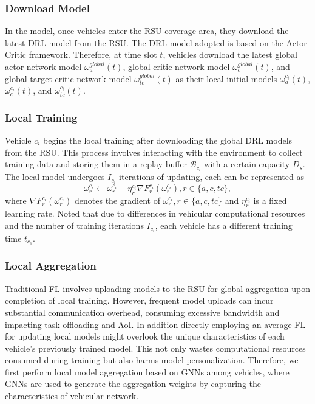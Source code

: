 \documentclass[lettersize,journal,onecolumn]{IEEEtran}
\begin{document}
\subsubsection {Download Model} In the model, once vehicles enter the RSU coverage area, they download the latest DRL model from the RSU. The DRL model adopted  is based on the Actor-Critic framework. Therefore, at time slot $t$, vehicles download the latest global actor network model $\omega _{a}^{global}(t)$, global critic network model $\omega _{c}^{global}(t)$, and global target critic network model $\omega _{tc}^{global}(t)$ as their local initial models $\omega _{a}^{{{{c}}_{i}}}(t)$, $\omega _{c}^{{{{c}}_{i}}}(t)$, and $\omega _{tc}^{{{{c}}_{i}}}(t)$.

\subsubsection {Local Training} Vehicle ${{{c}}_{i}}$ begins the local training after downloading the global DRL models from the RSU. 
This process involves interacting with the environment to collect training data and storing them in a replay buffer ${{\mathcal{B}}_{{{c}_{i}}}}$ with a certain capacity ${{D}_{s}}$. The local model undergoes ${{I}_{{{c}_{i}}}}$ iterations of updating, each can be represented as
\begin{equation}
\omega _{r}^{{{c}_{i}}}\leftarrow \omega _{r}^{{{c}_{i}}}-\eta _{r}^{{{c}_{i}}}\nabla F_{r}^{{{c}_{i}}}\left( \omega _{r}^{{{c}_{i}}} \right),r\in \{a,c,tc\},
\label{eq14}
\end{equation}
where $\nabla F_{r}^{{{c}_{i}}}\left( \omega _{r}^{{{c}_{i}}} \right)$ denotes the gradient of $\omega _{r}^{{{c}_{i}}},r\in \{a,c,tc\}$ and $\eta _{r}^{{{c}_{i}}}$ is a fixed learning rate. Noted that due to differences in vehicular computational resources and the number of training iterations ${{I}_{{{c}_{i}}}}$, each vehicle has a different training time ${{t}_{{{{c}}_{1}}}}$.



\subsubsection {Local Aggregation} Traditional FL involves uploading models to the RSU for global aggregation upon completion of local training. However, frequent model uploads can incur substantial communication overhead, consuming excessive bandwidth and impacting task offloading and AoI. 
 In addition directly employing an average FL for updating local models might overlook the unique characteristics of each vehicle's previously trained model. This not only wastes computational resources consumed during training but also harms model personalization. Therefore, we first perform local model aggregation based on GNNs among vehicles, where GNNs are used to generate the aggregation weights by capturing the characteristics of vehicular network.
 
\end{document}
